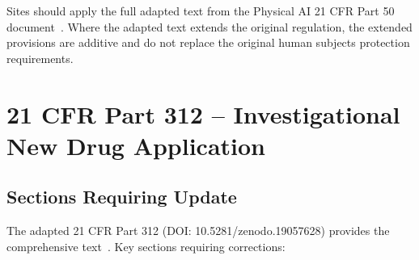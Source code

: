 \documentclass[11pt,letterpaper]{article}
\begin{document}
Sites should apply the full adapted text from the Physical AI 21 CFR Part 50
document~\cite{cfr50adapt}. Where the adapted text extends the original
regulation, the extended provisions are additive and do not replace the
original human subjects protection requirements.

\section{21 CFR Part 312 -- Investigational New Drug Application}

\subsection{Sections Requiring Update}

The adapted 21 CFR Part 312 (DOI: 10.5281/zenodo.19057628) provides the
comprehensive text~\cite{cfr312adapt}. Key sections requiring corrections:
\end{document}
